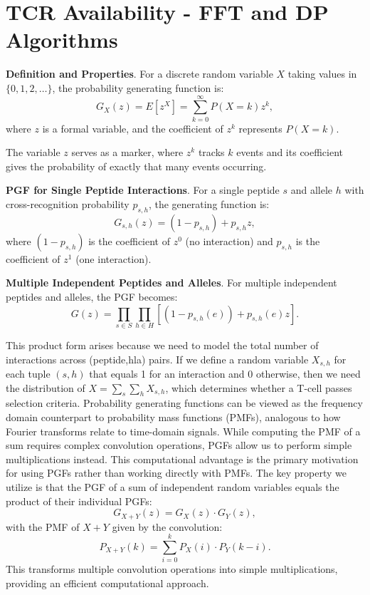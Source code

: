 \documentclass[11pt]{article}
\begin{document}
\newpage
\section{TCR Availability - FFT and DP Algorithms}
\label{sec:tcr_avail}



\textbf{Definition and Properties}. For a discrete random variable $X$ taking values in $\{0,1,2,\dots\}$, the probability generating function is:
\begin{equation}
G_X(z) = E[z^X] = \sum_{k=0}^{\infty} P(X = k) z^k,
\end{equation}
where $z$ is a formal variable, and the coefficient of $z^k$ represents $P(X = k)$.

The variable $z$ serves as a marker, where $z^k$ tracks $k$ events and its coefficient gives the probability of exactly that many events occurring.

\textbf{PGF for Single Peptide Interactions}. For a single peptide $s$ and allele $h$ with cross-recognition probability $p_{s,h}$, the generating function is:
\begin{equation}
G_{s,h}(z) = (1-p_{s,h}) + p_{s,h} z,
\end{equation}
where $(1-p_{s,h})$ is the coefficient of $z^0$ (no interaction) and $p_{s,h}$ is the coefficient of $z^1$ (one interaction).

\textbf{Multiple Independent Peptides and Alleles}. For multiple independent peptides and alleles, the PGF becomes:
\begin{equation}
G(z) = \prod_{s\in S}  \prod_{h\in H} \left[(1-p_{s,h}(e)) + p_{s,h}(e) z\right].
\end{equation}

This product form arises because we need to model the total number of interactions across (peptide,hla) pairs. If we define a random variable $X_{s,h}$ for each tuple $(s,h)$ that equals 1 for an interaction and 0 otherwise, then we need the distribution of $X = \sum_s\sum_h X_{s,h}$, which determines whether a T-cell passes selection criteria. Probability generating functions can be viewed as the frequency domain counterpart to probability mass functions (PMFs), analogous to how Fourier transforms relate to time-domain signals. While computing the PMF of a sum requires complex convolution operations, PGFs allow us to perform simple multiplications instead. This computational advantage is the primary motivation for using PGFs rather than working directly with PMFs. The key property we utilize is that the PGF of a sum of independent random variables equals the product of their individual PGFs:
\begin{equation}
G_{X+Y}(z) = G_X(z) \cdot G_Y(z),
\end{equation}
with the PMF of $X+Y$ given by the convolution:
\begin{equation}
P_{X+Y}(k) = \sum_{i=0}^{k} P_X(i) \cdot P_Y(k-i).
\end{equation}
This transforms multiple convolution operations into simple multiplications, providing an efficient computational approach.
\end{document}
